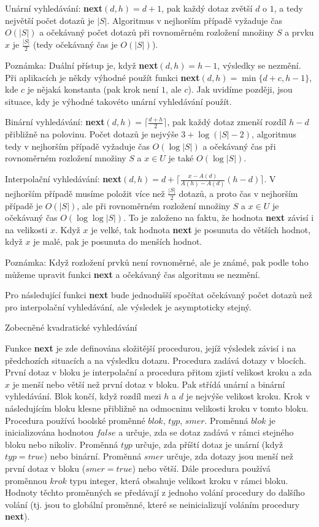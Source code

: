 \documentclass[a4paper,12pt]{article}
\begin{document}
Unární vyhledávání: {\bf next$(d,h)=d+1$}, pak každý 
dotaz zvětší $d$ o $1$, a tedy největší počet 
dotazů je $|S|$. Algoritmus v nej\-horším případě 
vyžaduje čas $O(|S|)$ a očekávaný počet dotazů při 
rovnoměrném rozložení množiny $S$ a prvku $x$ je $\frac {
|S|}2$ 
(tedy očekávaný čas je $O(|S|)$). 

Poznámka: Duální přístup je, když 
{\bf next$(d,h)=h-1$}, výsled\-ky se nezmění. Při aplikacích je 
někdy výhodné použít funkci {\bf next$(d,h)=\min\{d
+c,h-1\}$}, 
kde $c$ je nějaká konstanta (pak krok není $1$, ale $c$). Jak 
uvidíme později, jsou situace, kdy je výhodné  
takovéto unární vyhledávání použít.

Binární vyhledávání: {\bf next$(d,h)=\lceil\frac {
d+h}2\rceil$}, pak 
každý dotaz zmenší rozdíl $h-d$ přibližně na polovinu. 
Počet dotazů je nejvýše $3+\log(|S|-2)$, 
algoritmus tedy v 
nejhorším případě vyžaduje čas $O(\log|S|)$ a  
očekávaný čas při rovnoměrném roz\-ložení množiny $
S$ a 
$x\in U$ je také $O(\log|S|)$.

Interpolační vyhledávání: 
{\bf next$(d,h)=d+\lceil\frac {x-A(d)}{A(h)-A(d)}(h-d)\rceil$}. V nejhorším případě 
musíme položit více než $\frac {|S|}2$ dotazů, a proto čas 
v nejhorším případě je $O(|S|)$, ale při rovnoměrném 
roz\-ložení množiny $S$ a $x\in U$ je očekávaný čas 
$O(\log\log|S|)$. To je založeno na faktu, že hodnota {\bf next }
závisí i na velikosti $x$. Když $x$ je velké, tak hodnota 
{\bf next} je posunuta do větších hodnot, když $x$ je malé, 
pak je posunuta do menších hodnot.

Poznámka: Když rozložení prvků není 
rovnoměrné, ale je zná\-mé, pak podle toho můžeme  
upravit funkci {\bf next} a očekávaný čas algoritmu se 
nezmění.

Pro následující funkci {\bf next} bude 
jednodušší spočítat očekáva\-ný počet dotazů než 
pro interpolační vyhledávání, ale výsledek je 
asymptoticky stejný.

\subhead
Zobecněné kvadratické vyhledávání
\endsubhead

Funkce {\bf next }
je zde definována složitější procedurou, jejíž vý\-sle\-dek 
závisí i na předcho\-zích situacích a na výsledku dotazu.
Procedura zadává dotazy v blocích. První dotaz v bloku je 
interpolační a procedura přitom zjistí velikost kroku a 
zda $x$ je menší nebo větší než první dotaz v bloku.  
Pak střídá unární a binární vy\-hledávání. Blok končí, 
když rozdíl mezi $h$ a $d$ je nejvýše velikost 
kroku. Krok v následujícím bloku klesne 
přibližně na odmoc\-ninu velikosti kroku v tomto bloku. 
Procedura používá boolské pro\-měnné $blok$, $typ$, $
smer$. 
Proměnná $blok$ je inicializována hodnotou $false$ a určuje, 
zda se dotaz zadává v rámci stejného bloku nebo nikoliv. 
Proměnná $typ$ určuje, zda příští dotaz je unární (když 
$typ=true$) nebo binární. Proměnná $smer$ určuje, zda 
dotazy jsou menší než první dotaz v bloku ($smer=tr
ue$) 
nebo větší. Dále procedura používá proměnnou $
krok$ 
typu integer, která obsahuje velikost kroku v rámci 
bloku. Hodnoty těchto pro\-měn\-ných se předávají z jednoho 
volání procedury do dalšího volání (tj. jsou to 
globální proměnné, které se neinicializují voláním 
procedury {\bf next}). 
\end{document}
